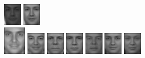 \begin{figure}[hbt]
  \includegraphics[width=0.08\textwidth]{../results/H_rez/incorrect90/1/9.jpg}
  \includegraphics[width=0.08\textwidth]{../results/H_rez/incorrect90/1/10.jpg} \\
  \vspace{4pt}
  \includegraphics[width=0.1\textwidth]{../results/H_rez/incorrect90/2/testImg.jpg} \vline
  \hspace{2pt}
  \includegraphics[width=0.08\textwidth]{../results/H_rez/incorrect90/2/1.jpg}
  \includegraphics[width=0.08\textwidth]{../results/H_rez/incorrect90/2/2.jpg}
  \includegraphics[width=0.08\textwidth]{../results/H_rez/incorrect90/2/3.jpg}
  \includegraphics[width=0.08\textwidth]{../results/H_rez/incorrect90/2/4.jpg}
  \includegraphics[width=0.08\textwidth]{../results/H_rez/incorrect90/2/5.jpg}
  \includegraphics[width=0.08\textwidth]{../results/H_rez/incorrect90/2/6.jpg}

\end{figure}
